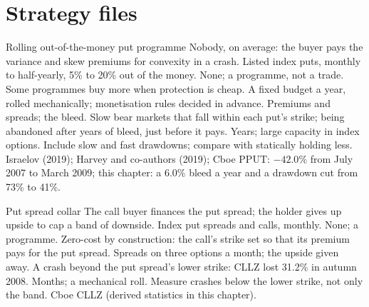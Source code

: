 \section{Strategy files}

\begin{strategyfile}{Rolling out-of-the-money put programme}\label{strat:s2:tail-hedging-and-long-volatility:puts}
 Nobody, on average: the buyer pays the variance and skew premiums for convexity in a crash.
 Listed index puts, monthly to half-yearly, 5\% to 20\% out of the money.
 None; a programme, not a trade. Some programmes buy more when protection is cheap.
 A fixed budget a year, rolled mechanically; monetisation rules decided in advance.
 Premiums and spreads; the bleed.
 Slow bear markets that fall within each put's strike; being abandoned after years of bleed, just before it pays.
 Years; large capacity in index options.
 Include slow and fast drawdowns; compare with statically holding less.
 Israelov (2019); Harvey and co-authors (2019); Cboe PPUT: $-42.0\%$ from July 2007 to March 2009; this chapter: a 6.0\% bleed a year
and a drawdown cut from 73\% to 41\%.
\end{strategyfile}

\begin{strategyfile}{Put spread collar}\label{strat:s2:tail-hedging-and-long-volatility:collar}
 The call buyer finances the put spread; the holder gives up upside to cap a band of downside.
 Index put spreads and calls, monthly.
 None; a programme.
 Zero-cost by construction: the call's strike set so that its premium pays for the put spread.
 Spreads on three options a month; the upside given away.
 A crash beyond the put spread's lower strike: CLLZ lost 31.2\% in autumn 2008.
 Months; a mechanical roll.
 Measure crashes below the lower strike, not only the band.
 Cboe CLLZ (derived statistics in this chapter).
\end{strategyfile}

